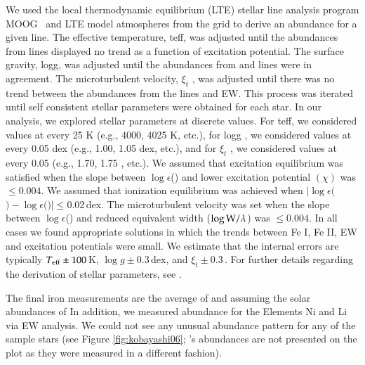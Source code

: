 We used the local thermodynamic equilibrium (LTE) stellar line analysis program MOOG \citemoog\ and LTE model atmospheres from the \citet{2003IAUS..210P.A20C} grid to derive an abundance for a given line. The effective temperature, \gls{teff}, was adjusted until the abundances from  lines displayed no trend as a function of excitation potential. The surface gravity, \gls{logg}, was adjusted until the abundances from  and  lines were in agreement. The microturbulent velocity, $\xi _{t}$ , was adjusted until there was no trend between the abundances from the  lines and EW. This process was iterated until self consistent stellar parameters were obtained  for each star. In our analysis, we explored stellar parameters at discrete values. For \gls{teff}, we considered values at every 25 K (e.g., 4000, 4025 K, etc.), for \gls{logg} , we considered values at every 0.05 dex (e.g., 1.00, 1.05 dex, etc.), and for $\xi _{t}$ , we considered values at every 0.05 \kms (e.g., 1.70, 1.75 \kms, etc.). We assumed that excitation equilibrium was satisfied when the slope between $\log{\epsilon}$() and lower excitation potential $(\chi)$ was $\leq0.004$. We assumed that ionization equilibrium was achieved when $\vert\log{\epsilon} ($$) - \log{\epsilon} ($$)\vert \leq 0.02$\,dex. The microturbulent velocity was set when the slope between $\log{\epsilon}$() and reduced equivalent width ($\log{\rm{W}}/\lambda$) was $\leq0.004$. In all cases we found appropriate solutions in which the trends between Fe I, Fe II, EW and excitation potentials were small. We estimate that the internal errors are typically $T_{\rm{eff}}\pm100$\,K, $\log{g}\pm0.3$\,dex, and $\xi _{t}\pm0.3$\,\kms. 
For further details regarding the derivation of stellar parameters, see \citet{2008ApJ...673..854Y}.

The final iron measurements are the average of  and  assuming the solar abundances of \citet{2009ARA&A..47..481A} 
In addition, we measured abundance for the Elements Ni and Li via EW analysis. We could not see any unusual abundance pattern for any of the sample stars (see Figure \ref{fig:kobayashi06}; \starb's abundances are not presented on the plot as they were measured in a different fashion).  



